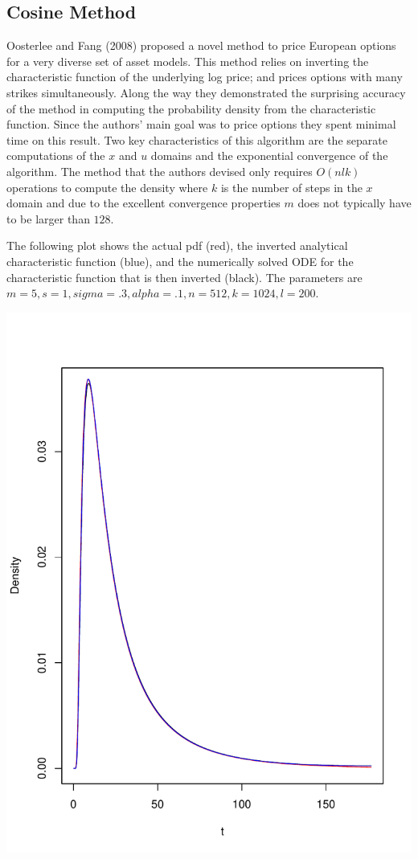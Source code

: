 \documentclass[12pt]{article}
\begin{document}
\subsection{Cosine Method}
Oosterlee  and Fang (2008) proposed a novel method to price European options for a very diverse set of asset models.  This method relies on inverting the characteristic function of the underlying log price; and prices options with many strikes simultaneously.  Along the way they demonstrated the surprising accuracy of the method in computing the probability density from the characteristic function.  Since the authors' main goal was to price options they spent minimal time on this result. Two key characteristics of this algorithm are the separate computations of the \(x\) and \(u\) domains and the exponential convergence of the algorithm.  The method that the authors devised only requires \(O(nlk)\) operations to compute the density where \(k\) is the number of steps in the \(x\) domain and due to the excellent convergence properties \(m\) does not typically have to be larger than \(128\).  




The following plot shows the actual pdf (red), the inverted analytical characteristic function (blue), and the numerically solved ODE for the characteristic function that is then inverted (black).  The parameters are \(m=5, s=1, sigma=.3, alpha=.1, n=512, k=1024, l=200\).

\includegraphics{fig-006}
\end{document}
